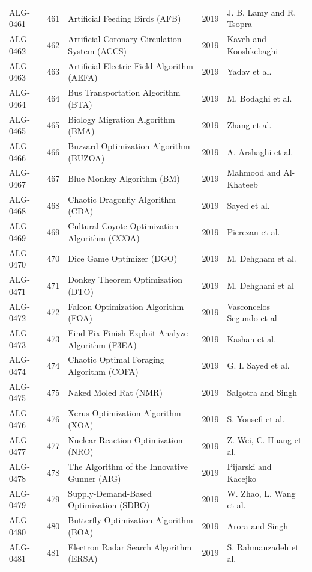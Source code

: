 \documentclass[8pt]{article}
\begin{document}
\begin{landscape}
\begin{longtable}{P{1.7cm}rP{10.0cm}rP{7.2cm}}
ALG-0461 & 461 & Artificial Feeding Birds (AFB) & 2019 & J. B. Lamy and R. Tsopra \\
ALG-0462 & 462 & Artificial Coronary Circulation System (ACCS) & 2019 & Kaveh and Kooshkebaghi \\
ALG-0463 & 463 & Artificial Electric Field Algorithm (AEFA) & 2019 & Yadav et al. \\
ALG-0464 & 464 & Bus Transportation Algorithm (BTA) & 2019 & M. Bodaghi et al. \\
ALG-0465 & 465 & Biology Migration Algorithm (BMA) & 2019 & Zhang et al. \\
ALG-0466 & 466 & Buzzard Optimization Algorithm (BUZOA) & 2019 & A. Arshaghi et al. \\
ALG-0467 & 467 & Blue Monkey Algorithm (BM) & 2019 & Mahmood and Al-Khateeb \\
ALG-0468 & 468 & Chaotic Dragonfly Algorithm (CDA) & 2019 & Sayed et al. \\
ALG-0469 & 469 & Cultural Coyote Optimization Algorithm (CCOA) & 2019 & Pierezan et al. \\
ALG-0470 & 470 & Dice Game Optimizer (DGO) & 2019 & M. Dehghanı et al. \\
ALG-0471 & 471 & Donkey Theorem Optimization (DTO) & 2019 & M. Dehghani et al \\
ALG-0472 & 472 & Falcon Optimization Algorithm (FOA) & 2019 & Vasconcelos Segundo et al \\
ALG-0473 & 473 & Find-Fix-Finish-Exploit-Analyze Algorithm (F3EA) & 2019 & Kashan et al. \\
ALG-0474 & 474 & Chaotic Optimal Foraging Algorithm (COFA) & 2019 & G. I. Sayed et al. \\
ALG-0475 & 475 & Naked Moled Rat (NMR) & 2019 & Salgotra and Singh \\
ALG-0476 & 476 & Xerus Optimization Algorithm (XOA) & 2019 & S. Yousefi et al. \\
ALG-0477 & 477 & Nuclear Reaction Optimization (NRO) & 2019 & Z. Wei, C. Huang et al. \\
ALG-0478 & 478 & The Algorithm of the Innovative Gunner (AIG) & 2019 & Pijarski and Kacejko \\
ALG-0479 & 479 & Supply-Demand-Based Optimization (SDBO) & 2019 & W. Zhao, L. Wang et al. \\
ALG-0480 & 480 & Butterfly Optimization Algorithm (BOA) & 2019 & Arora and Singh \\
ALG-0481 & 481 & Electron Radar Search Algorithm (ERSA) & 2019 & S. Rahmanzadeh et al. \\

\end{longtable}
\end{landscape}
\end{document}
